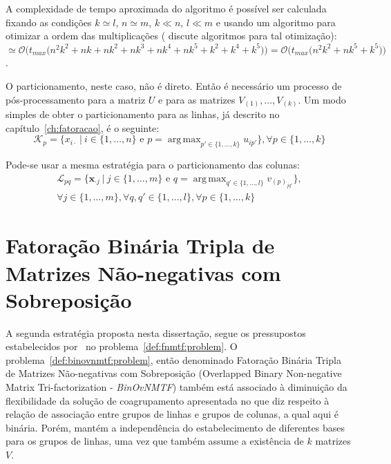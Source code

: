 \documentclass[
    12pt,                %
    oneside,            %
    a4paper,            %
    english,            %
    brazil                %
    ]{abntex2ppgsi}
\DeclareMathOperator*{\argmax}{arg\,max}
\begin{document}
A complexidade de tempo aproximada do algoritmo é possível ser calculada fixando as condições $k \simeq l$, $n \simeq m$, $k \ll n$, $l \ll m$ e usando um algoritmo para otimizar a ordem das multiplicações ( discute algoritmos para tal otimização): $\simeq \mathcal{O}\Big( t_{max} \big( n^2k^2 + nk + nk^2 + nk^3 + nk^4 + nk^5 + k^2 + k^4 + k^5 \big) \Big) = \mathcal{O}\Big( t_{max} \big( n^2k^2 + nk^5 + k^5 \big) \Big)$.


O particionamento, neste caso, não é direto.
Então é necessário um processo de pós-processamento para a matriz $U$ e para as matrizes $V_{(1)}, \dots, V_{(k)}$.
Um modo simples de obter o particionamento para as linhas, já descrito no capítulo~\ref{ch:fatoracao}, é o seguinte:
\[
    \mathcal{K}_{p}=\{x_{i\cdot}~|~i\in\{1,\dots,n\}\text{ e }p=\argmax_{p'\in\{1,\dots,k\}} u_{ip'} \}, \forall p\in\{1,\dots,k\}
\]

Pode-se usar a mesma estratégia para o particionamento das colunas:
\begin{align*}
    \mathcal{L}_{pq} = \{ \mathbf{x}_{\cdot j}~|~j \in \{1, \dots, m \} \text{ e } q = \argmax_{q' \in \{1, \dots, l\}} v_{(p)_{j q'}} \}, \\
    \forall j \in \{1, \dots, m\}, \forall q, q' \in \{1, \dots, l\}, \forall p \in \{1, \dots, k\}
\end{align*}

\section{Fatoração Binária Tripla de Matrizes Não-negativas com Sobreposição}


A segunda estratégia proposta nesta dissertação, segue os pressupostos estabelecidos por~ no problema~\ref{def:fnmtf:problem}.
O problema~\ref{def:binovnmtf:problem}, então denominado Fatoração Binária Tripla de Matrizes Não-negativas com Sobreposição (Overlapped Binary Non-negative Matrix Tri-factorization - \textit{BinOvNMTF}) também está associado à diminuição da flexibilidade da solução de coagrupamento apresentada no que diz respeito à relação de associação entre grupos de linhas e grupos de colunas, a qual aqui é binária.
Porém, mantém a independência do estabelecimento de diferentes bases para os grupos de linhas, uma vez que também assume a existência de $k$ matrizes $V$.
\end{document}
